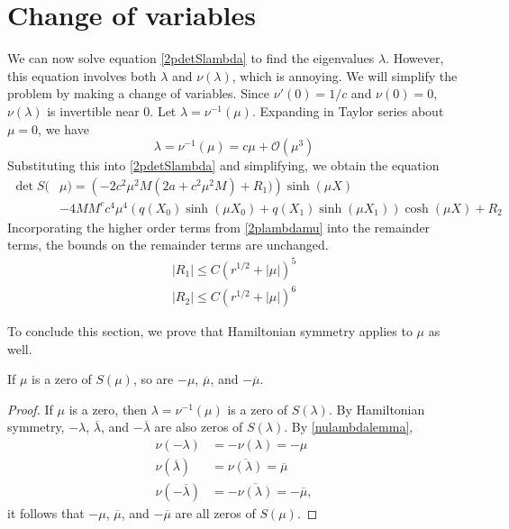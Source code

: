 \documentclass[thesis.tex]{subfiles}
\begin{document}
\section{Change of variables}

We can now solve equation \cref{2pdetSlambda} to find the eigenvalues $\lambda$. However, this equation involves both $\lambda$ and $\nu(\lambda)$, which is annoying. We will simplify the problem by making a change of variables. Since $\nu'(0) = 1/c$ and $\nu(0) = 0$, $\nu(\lambda)$ is invertible near 0. Let $\lambda = \nu^{-1}(\mu)$. Expanding in Taylor series about $\mu = 0$, we have
\begin{equation}\label{2plambdamu}
\lambda = \nu^{-1}(\mu) = c \mu + \mathcal{O}(\mu^3)
\end{equation}
Substituting this into \cref{2pdetSlambda} and simplifying, we obtain the equation
\begin{equation}\label{2detBeqmu}
\begin{aligned}
\det S(&\mu) = \left(-2 c^2 \mu^2 M (2a + c^2 \mu^2 M) + R_1 )\right) \sinh(\mu X) \\
&-4 M M^c c^4 \mu^4 ( q(X_0) \sinh(\mu X_0) + q(X_1) \sinh(\mu X_1) ) \cosh(\mu X) + R_2
\end{aligned}
\end{equation}
Incorporating the higher order terms from \cref{2plambdamu} into the remainder terms, the bounds on the remainder terms are unchanged.
\begin{equation}\label{muRbounds}
\begin{aligned}
|R_1| \leq C(r^{1/2} + |\mu|)^5 \\
|R_2| \leq C(r^{1/2} + |\mu|)^6
\end{aligned}
\end{equation}

To conclude this section, we prove that Hamiltonian symmetry applies to $\mu$ as well.

\begin{lemma}\label{lemma:Hamsymmmu}
If $\mu$ is a zero of $S(\mu)$, so are $-\mu$, $\overline{\mu}$, and $-\overline{\mu}$.
\begin{proof}
If $\mu$ is a zero, then $\lambda = \nu^{-1}(\mu)$ is a zero of $S(\lambda)$. By Hamiltonian symmetry, $-\lambda$, $\overline{\lambda}$, and $-\overline{\lambda}$ are also zeros of $S(\lambda)$. By \cref{nulambdalemma},
\begin{align*}
\nu(-\lambda) &= -\nu(\lambda) = -\mu \\
\nu(\overline{\lambda}) &= \overline{ \nu(\lambda) } = \overline{\mu} \\
\nu(-\overline{\lambda}) &= -\overline{ \nu(\lambda) } = -\overline{\mu},
\end{align*}
it follows that $-\mu$, $\overline{\mu}$, and $-\overline{\mu}$ are all zeros of $S(\mu)$.
\end{proof}
\end{lemma}
\end{document}
